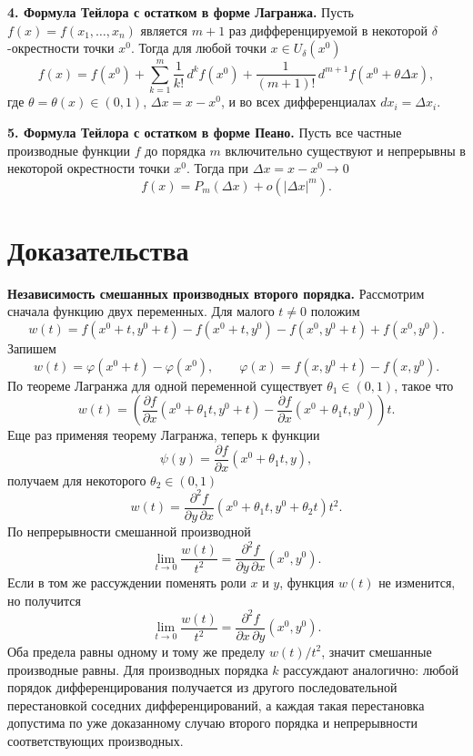 \documentclass[12pt,a4paper]{article}
\newcommand{\Dx}{\Delta x}
\begin{document}
\textbf{4. Формула Тейлора с остатком в форме Лагранжа.}
Пусть \(f(x)=f(x_1,\dots,x_n)\) является \(m+1\) раз дифференцируемой в
некоторой \(\delta\)-окрестности точки \(x^0\). Тогда для любой точки
\(x\in U_\delta(x^0)\)
\[
  f(x)
  =
  f(x^0)
  +\sum_{k=1}^m\frac{1}{k!}\,d^k f(x^0)
  +\frac{1}{(m+1)!}\,d^{m+1}f(x^0+\theta\Dx),
\]
где \(\theta=\theta(x)\in(0,1)\), \(\Dx=x-x^0\), и во всех дифференциалах
\(dx_i=\Delta x_i\).

\textbf{5. Формула Тейлора с остатком в форме Пеано.}
Пусть все частные производные функции \(f\) до порядка \(m\) включительно
существуют и непрерывны в некоторой окрестности точки \(x^0\). Тогда при
\(\Dx=x-x^0\to0\)
\[
  f(x)=P_m(\Dx)+o(|\Dx|^m).
\]

\section*{Доказательства}

\textbf{Независимость смешанных производных второго порядка.}
Рассмотрим сначала функцию двух переменных. Для малого \(t\ne0\) положим
\[
  w(t)=
  f(x^0+t,y^0+t)-f(x^0+t,y^0)-f(x^0,y^0+t)+f(x^0,y^0).
\]
Запишем
\[
  w(t)=\varphi(x^0+t)-\varphi(x^0),
  \qquad
  \varphi(x)=f(x,y^0+t)-f(x,y^0).
\]
По теореме Лагранжа для одной переменной существует
\(\theta_1\in(0,1)\), такое что
\[
  w(t)=
  \left(
    \frac{\partial f}{\partial x}(x^0+\theta_1t,y^0+t)
    -
    \frac{\partial f}{\partial x}(x^0+\theta_1t,y^0)
  \right)t.
\]
Еще раз применяя теорему Лагранжа, теперь к функции
\[
  \psi(y)=\frac{\partial f}{\partial x}(x^0+\theta_1t,y),
\]
получаем для некоторого \(\theta_2\in(0,1)\)
\[
  w(t)=
  \frac{\partial^2 f}{\partial y\,\partial x}
  (x^0+\theta_1t,y^0+\theta_2t)t^2.
\]
По непрерывности смешанной производной
\[
  \lim_{t\to0}\frac{w(t)}{t^2}
  =
  \frac{\partial^2 f}{\partial y\,\partial x}(x^0,y^0).
\]
Если в том же рассуждении поменять роли \(x\) и \(y\), функция \(w(t)\) не
изменится, но получится
\[
  \lim_{t\to0}\frac{w(t)}{t^2}
  =
  \frac{\partial^2 f}{\partial x\,\partial y}(x^0,y^0).
\]
Оба предела равны одному и тому же пределу \(w(t)/t^2\), значит смешанные
производные равны. Для производных порядка \(k\) рассуждают аналогично:
любой порядок дифференцирования получается из другого последовательной
перестановкой соседних дифференцирований, а каждая такая перестановка
допустима по уже доказанному случаю второго порядка и непрерывности
соответствующих производных.
\end{document}
